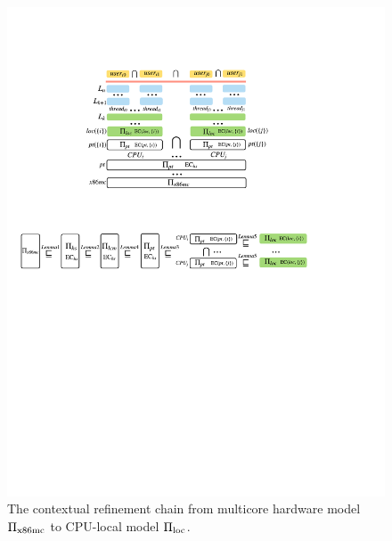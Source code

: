 \begin{figure}
\begin{center}
\includegraphics[scale=0.8]{figs/machine_chain}
\vspace*{-8pt}	
\end{center}
\caption{The contextual refinement chain from multicore hardware model
$\Pi_{\text{x86mc}}$ to CPU-local model $\Pi_{\text{loc}}$.}
\label{fig:spec:chain}
\vspace*{-10pt}
\end{figure}

\vspace*{-2pt}
